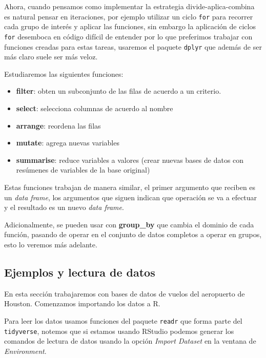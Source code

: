 \documentclass[
]{book}
\providecommand{\tightlist}{%
  \setlength{\itemsep}{0pt}\setlength{\parskip}{0pt}}
\begin{document}
Ahora, cuando pensamos como implementar la estrategia divide-aplica-combina es
natural pensar en iteraciones, por ejemplo utilizar un ciclo \texttt{for} para recorrer
cada grupo de interés y aplicar las funciones, sin embargo la aplicación de
ciclos \texttt{for} desemboca en código difícil de entender por lo que preferimos
trabajar con funciones creadas para estas tareas, usaremos el paquete
\texttt{dplyr} que además de ser más claro suele ser más veloz.

Estudiaremos las siguientes funciones:

\begin{itemize}
\tightlist
\item
  \textbf{filter}: obten un subconjunto de las filas de acuerdo a un criterio.
\item
  \textbf{select}: selecciona columnas de acuerdo al nombre
\item
  \textbf{arrange}: reordena las filas
\item
  \textbf{mutate}: agrega nuevas variables
\item
  \textbf{summarise}: reduce variables a valores (crear nuevas bases de datos con
  resúmenes de variables de la base original)
\end{itemize}

Estas funciones trabajan de manera similar, el primer argumento que reciben
es un \emph{data frame}, los argumentos que siguen
indican que operación se va a efectuar y el resultado es un nuevo \emph{data frame}.

Adicionalmente, se pueden usar con \textbf{group\_by} que cambia el dominio de cada
función, pasando de operar en el conjunto de datos completos a operar en
grupos, esto lo veremos más adelante.

\hypertarget{ejemplos-y-lectura-de-datos}{%
\subsection*{Ejemplos y lectura de datos}\label{ejemplos-y-lectura-de-datos}}

En esta sección trabajaremos con bases de datos de vuelos del aeropuerto de
Houston. Comenzamos importando los datos a R.

Para leer los datos usamos funciones del paquete \texttt{readr} que forma parte del
\texttt{tidyverse}, notemos que si estamos usando RStudio podemos generar los comandos
de lectura de datos usando la opción \emph{Import Dataset} en la ventana de
\emph{Environment}.
\end{document}
